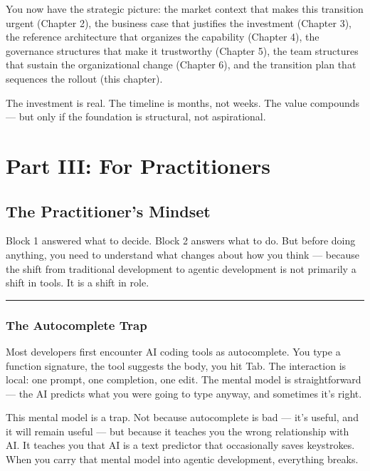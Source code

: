 \documentclass[
  a4paper,
  DIV=11,
  numbers=noendperiod]{scrreprt}
\begin{document}
You now have the strategic picture: the market context that makes this
transition urgent (Chapter 2), the business case that justifies the
investment (Chapter 3), the reference architecture that organizes the
capability (Chapter 4), the governance structures that make it
trustworthy (Chapter 5), the team structures that sustain the
organizational change (Chapter 6), and the transition plan that
sequences the rollout (this chapter).

The investment is real. The timeline is months, not weeks. The value
compounds --- but only if the foundation is structural, not
aspirational.

\part{Part III: For Practitioners}

\chapter{The Practitioner's Mindset}\label{the-practitioners-mindset}

Block 1 answered what to decide. Block 2 answers what to do. But before
doing anything, you need to understand what changes about how you think
--- because the shift from traditional development to agentic
development is not primarily a shift in tools. It is a shift in role.

\begin{center}\rule{0.5\linewidth}{0.5pt}\end{center}

\section{The Autocomplete Trap}\label{the-autocomplete-trap}

Most developers first encounter AI coding tools as autocomplete. You
type a function signature, the tool suggests the body, you hit Tab. The
interaction is local: one prompt, one completion, one edit. The mental
model is straightforward --- the AI predicts what you were going to type
anyway, and sometimes it's right.

This mental model is a trap. Not because autocomplete is bad --- it's
useful, and it will remain useful --- but because it teaches you the
wrong relationship with AI. It teaches you that AI is a text predictor
that occasionally saves keystrokes. When you carry that mental model
into agentic development, everything breaks.
\end{document}
